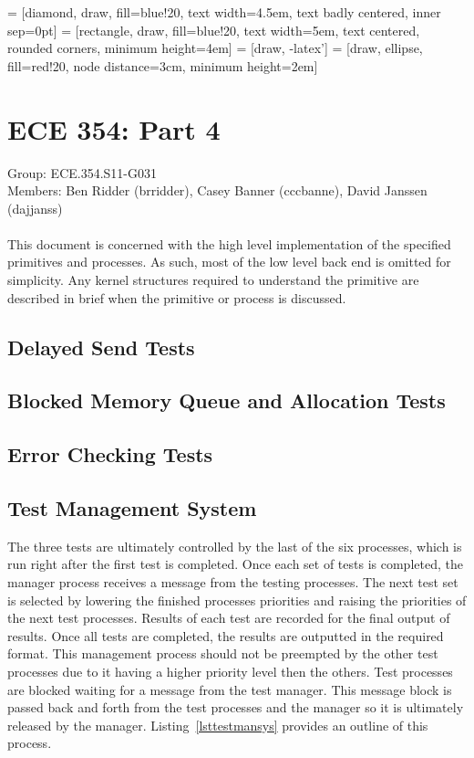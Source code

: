 \documentclass[oneside]{article}
\begin{document}
\lstset{language=C, 
        frame=single, 
        breaklines=true,
        basicstyle=\small\ttfamily,
        columns=fullflexible}

 = [diamond, draw, fill=blue!20, text width=4.5em, text
    badly centered, inner sep=0pt]
 = [rectangle, draw, fill=blue!20, text width=5em, text
    centered, rounded corners, minimum height=4em]
 = [draw, -latex']
 = [draw, ellipse, fill=red!20, node distance=3cm, minimum
    height=2em]

\section*{ECE 354: Part 4}
Group: ECE.354.S11-G031 \\
Members: Ben Ridder (brridder), Casey Banner (cccbanne), 
David Janssen (dajjanss) \\ \\
This document is concerned with the high level implementation of the specified
primitives and processes. As such, most of the low level back end is omitted
for simplicity. Any kernel structures required to understand the primitive are
described in brief when the primitive or process is discussed.

\subsection*{Delayed Send Tests}

\subsection*{Blocked Memory Queue and Allocation Tests}

\subsection*{Error Checking Tests}

\subsection*{Test Management System}
The three tests are ultimately controlled by the last of the six processes,
which is run right after the first test is completed. Once each set of tests is
completed, the manager process receives a message from the testing processes.
The next test set is selected by lowering the finished processes priorities and
raising the priorities of the next test processes. Results of each test are
recorded for the final output of results. Once all tests are completed, the
results are outputted in the required format. This management process should
not be preempted by the other test processes due to it having a higher priority
level then the others. Test processes are blocked waiting for a message from
the test manager. This message block is passed back and forth from the test
processes and the manager so it is ultimately released by the manager.
Listing~\ref{lsttestmansys} provides an outline of this process.
\end{document}
